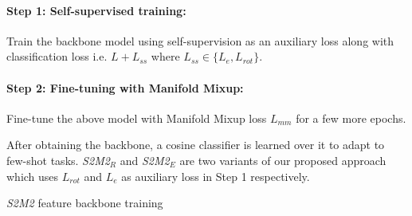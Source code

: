 \documentclass[10pt,twocolumn,letterpaper]{article}
\begin{document}
\paragraph{Step 1: Self-supervised training:} Train the backbone model using self-supervision as an auxiliary loss along with classification loss i.e. $L + L_{ss}$ where $L_{ss} \in \{L_e, L_{rot}\}$. 
\vspace{-3pt}
\paragraph{Step 2: Fine-tuning with Manifold Mixup:} Fine-tune the above model with Manifold Mixup loss $L_{mm}$ for a few more epochs. 

After obtaining the backbone, a cosine classifier is learned over it to adapt to few-shot tasks. \textit{S2M2$_R$} and \textit{S2M2$_E$} are two variants of our proposed approach which uses $L_{rot}$ and $L_{e}$ as auxiliary loss in Step 1 respectively.


\begin{algorithm}[t]
\SetAlgoLined
{}
 \caption{\footnotesize{\textit{S2M2} feature backbone training}}
\label{feature_adv_train_algo}
\end{algorithm}
\end{document}
